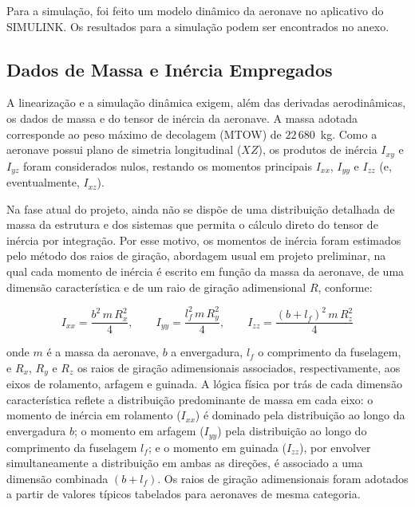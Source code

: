 
Para a simulação, foi feito um modelo dinâmico da aeronave no aplicativo do SIMULINK. Os resultados para a simulação podem ser encontrados no anexo.

\subsection{Dados de Massa e Inércia Empregados}


A linearização e a simulação dinâmica exigem, além das derivadas aerodinâmicas, os dados de massa e do tensor de inércia da aeronave. A massa adotada corresponde ao peso máximo de decolagem (MTOW) de $22\,680$~kg. Como a aeronave possui plano de simetria longitudinal ($XZ$), os produtos de inércia $I_{xy}$ e $I_{yz}$ foram considerados nulos, restando os momentos principais $I_{xx}$, $I_{yy}$ e $I_{zz}$ (e, eventualmente, $I_{xz}$).

Na fase atual do projeto, ainda não se dispõe de uma distribuição detalhada de massa da estrutura e dos sistemas que permita o cálculo direto do tensor de inércia por integração. Por esse motivo, os momentos de inércia foram estimados pelo método dos raios de giração, abordagem usual em projeto preliminar, na qual cada momento de inércia é escrito em função da massa da aeronave, de uma dimensão característica e de um raio de giração adimensional $R$, conforme:

\begin{equation}
    I_{xx} = \frac{b^2 \, m \, R_x^2}{4}, \qquad
    I_{yy} = \frac{l_f^2 \, m \, R_y^2}{4}, \qquad
    I_{zz} = \frac{(b + l_f)^2 \, m \, R_z^2}{4}
    \label{eq:inercia_giracao}
\end{equation}

onde $m$ é a massa da aeronave, $b$ a envergadura, $l_f$ o comprimento da fuselagem, e $R_x$, $R_y$ e $R_z$ os raios de giração adimensionais associados, respectivamente, aos eixos de rolamento, arfagem e guinada. A lógica física por trás de cada dimensão característica reflete a distribuição predominante de massa em cada eixo: o momento de inércia em rolamento ($I_{xx}$) é dominado pela distribuição ao longo da envergadura $b$; o momento em arfagem ($I_{yy}$) pela distribuição ao longo do comprimento da fuselagem $l_f$; e o momento em guinada ($I_{zz}$), por envolver simultaneamente a distribuição em ambas as direções, é associado a uma dimensão combinada $(b + l_f)$. Os raios de giração adimensionais foram adotados a partir de valores típicos tabelados para aeronaves de mesma categoria.

